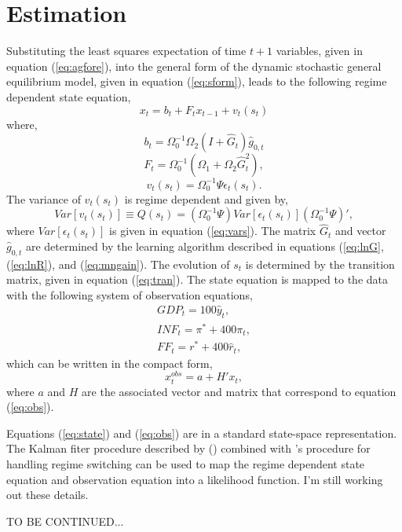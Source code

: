 \documentclass[12pt]{article}
\newcommand{\beq}{\begin{equation}}
\newcommand{\eeq}{\end{equation}}
\newcommand{\citee}[1]{\citename{#1} (\citeyear{#1})}
\newcommand{\h}[1]{\hat{#1}}
\newcommand{\ds}{\displaystyle}
\begin{document}
\section{Estimation}
Substituting the least squares expectation of time $t+1$ variables, given in equation (\ref{eq:agfore}), into the general form of the dynamic stochastic general equilibrium model, given in equation (\ref{eq:sform}), leads to the following regime dependent state equation,
\beq \label{eq:state} x_t = b_t + F_t x_{t-1} + v_{t}(s_t) \eeq
where,
\beq \label{eq:bt} b_t = \Omega_0^{-1}\Omega_{2}\left(I+\h{G}_t\right)\h{g}_{0,t} \eeq
\beq \label{eq:Ft} F_t = \Omega_0^{-1} \left(\Omega_{1} + \Omega_{2} \h{G}_t^2 \right), \eeq
\beq v_t(s_t) = \Omega_0^{-1} \Psi \epsilon_t(s_t). \eeq
The variance of $v_t(s_t)$ is regime dependent and given by,
\beq \label{eq:Q} Var\left[v_{t}(s_t)\right] \equiv Q(s_t) = \left( \Omega_0^{-1} \Psi \right) Var\left[\epsilon_t(s_t)\right] \left(\Omega_0^{-1} \Psi\right)', \eeq
where $Var\left[\epsilon_t(s_t)\right]$ is given in equation (\ref{eq:vars}).  The matrix $\h{G}_t$ and vector $\h{g}_{0,t}$ are determined by the learning algorithm described in equations (\ref{eq:lnG}, (\ref{eq:lnR}), and (\ref{eq:mngain}).  The evolution of $s_t$ is determined by the transition matrix, given in equation (\ref{eq:tran}).  The state equation is mapped to the data with the following system of observation equations,
\beq \begin{array}{c} \label{eq:obs}  
\ds GDP_t = 100 \h{y}_t, \\
\ds INF_t = \pi^{*} + 400\pi_t, \\
\ds FF_t = r^{*} + 400\h{r}_t,
\end{array}
\eeq
which can be written in the compact form,
\beq \label{ap:obs} x_t^{obs} = a + H' x_t, \eeq
where $a$ and $H$ are the associated vector and matrix that correspond to equation (\ref{eq:obs}).

Equations (\ref{eq:state}) and (\ref{eq:obs}) are in a standard state-space representation.  The Kalman fiter procedure described by \citee{hamilton} combined with 's \citeyear{hamilton1989} procedure for handling regime switching can be used to map the regime dependent state equation and observation equation into a likelihood function.  I'm still working out these details.

TO BE CONTINUED...

\newpage
\end{document}
